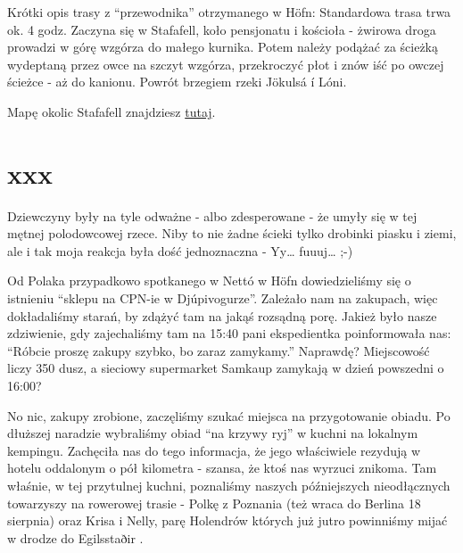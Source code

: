 

Krótki opis trasy z “przewodnika” otrzymanego w Höfn: Standardowa trasa trwa ok. 4 godz. Zaczyna się w Stafafell, koło pensjonatu i kościoła - żwirowa droga prowadzi w górę wzgórza do małego kurnika. Potem należy podążać za ścieżką wydeptaną przez owce na szczyt wzgórza, przekroczyć płot i znów iść po owczej ścieżce - aż do kanionu. Powrót brzegiem rzeki Jökulsá í Lóni.

Mapę okolic Stafafell znajdziesz \href{http://www.stafafell.is/uploads/8/3/3/1/8331287/5674623_orig.jpg}{tutaj}.

\section{xxx}

Dziewczyny były na tyle odważne - albo zdesperowane - że umyły się w tej mętnej polodowcowej rzece. Niby to nie żadne ścieki tylko drobinki piasku i ziemi, ale i tak moja reakcja była dość jednoznaczna - Yy… fuuuj… ;-)

Od Polaka przypadkowo spotkanego w Nettó w Höfn dowiedzieliśmy się o istnieniu “sklepu na CPN-ie w Djúpivogurze”. Zależało nam na zakupach, więc dokładaliśmy starań, by zdążyć tam na jakąś rozsądną porę. Jakież było nasze zdziwienie, gdy zajechaliśmy tam na 15:40 pani ekspedientka poinformowała nas: “Róbcie proszę zakupy szybko, bo zaraz zamykamy.” Naprawdę? Miejscowość liczy 350 dusz, a sieciowy supermarket Samkaup zamykają w dzień powszedni o 16:00?



No nic, zakupy zrobione, zaczęliśmy szukać miejsca na przygotowanie obiadu. Po dłuższej naradzie wybraliśmy obiad “na krzywy ryj” w kuchni na lokalnym kempingu. Zachęciła nas do tego informacja, że jego właściwiele rezydują w hotelu oddalonym o pół kilometra - szansa, że ktoś nas wyrzuci znikoma. Tam właśnie, w tej przytulnej kuchni, poznaliśmy naszych późniejszych nieodłącznych towarzyszy na rowerowej trasie - Polkę z Poznania (też wraca do Berlina 18 sierpnia) oraz Krisa i Nelly, parę Holendrów których już jutro powinniśmy mijać w drodze do Egilsstaðir .

